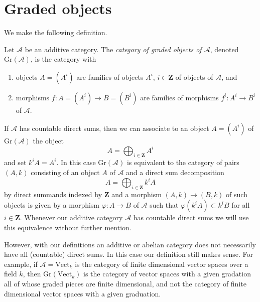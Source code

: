 

















\section{Graded objects}
\label{section-graded}

\noindent
We make the following definition.

\begin{definition}
\label{definition-graded}
Let $\mathcal{A}$ be an additive category. The {\it category of graded
objects of $\mathcal{A}$}, denoted $\text{Gr}(\mathcal{A})$, is
the category with
\begin{enumerate}
\item objects $A = (A^i)$ are families of objects $A^i$, $i \in \mathbf{Z}$
of objects of $\mathcal{A}$, and
\item morphisms $f : A = (A^i) \to B = (B^i)$ are families of
morphisms $f^i : A^i \to B^i$ of $\mathcal{A}$.
\end{enumerate}
\end{definition}

\noindent
If $\mathcal{A}$ has countable direct sums, then we can associate to
an object $A = (A^i)$ of $\text{Gr}(\mathcal{A})$ the object
$$
A = \bigoplus\nolimits_{i \in \mathbf{Z}} A^i
$$
and set $k^iA = A^i$. In this case $\text{Gr}(\mathcal{A})$ is equivalent
to the category of pairs $(A, k)$ consisting of an object $A$ of
$\mathcal{A}$ and a direct sum decomposition
$$
A = \bigoplus\nolimits_{i \in \mathbf{Z}} k^iA
$$
by direct summands indexed by $\mathbf{Z}$ and a morphism $(A, k) \to (B, k)$
of such objects is given by a morphism $\varphi : A \to B$ of $\mathcal{A}$
such that $\varphi(k^iA) \subset k^iB$ for all $i \in \mathbf{Z}$. Whenever
our additive category $\mathcal{A}$ has countable direct sums we will
use this equivalence without further mention.

\medskip\noindent
However, with our definitions an additive or abelian category does not
necessarily have all (countable) direct sums. In this case our definition
still makes sense. For example, if $\mathcal{A} = \text{Vect}_k$ is the
category of finite dimensional vector spaces over a field $k$, then
$\text{Gr}(\text{Vect}_k)$ is the category of vector
spaces with a given gradation all of whose graded pieces are finite
dimensional, and not the category of finite dimensional vector
spaces with a given graduation.

